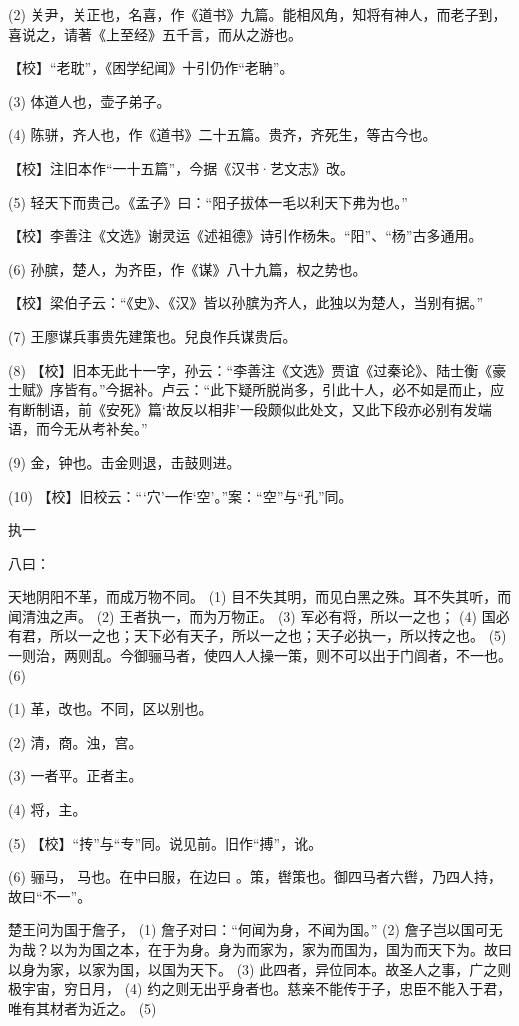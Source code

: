 \documentclass[12pt,UTF8]{ctexbook}
\begin{document}
(2) 关尹，关正也，名喜，作《道书》九篇。能相风角，知将有神人，而老子到，喜说之，请著《上至经》五千言，而从之游也。

【校】“老耽”，《困学纪闻》十引仍作“老聃”。

(3) 体道人也，壶子弟子。

(4) 陈骈，齐人也，作《道书》二十五篇。贵齐，齐死生，等古今也。

【校】注旧本作“一十五篇”，今据《汉书·艺文志》改。

(5) 轻天下而贵己。《孟子》曰：“阳子拔体一毛以利天下弗为也。”

【校】李善注《文选》谢灵运《述祖德》诗引作杨朱。“阳”、“杨”古多通用。

(6) 孙膑，楚人，为齐臣，作《谋》八十九篇，权之势也。

【校】梁伯子云：“《史》、《汉》皆以孙膑为齐人，此独以为楚人，当别有据。”

(7) 王廖谋兵事贵先建策也。兒良作兵谋贵后。

(8) 【校】旧本无此十一字，孙云：“李善注《文选》贾谊《过秦论》、陆士衡《豪士赋》序皆有。”今据补。卢云：“此下疑所脱尚多，引此十人，必不如是而止，应有断制语，前《安死》篇‘故反以相非’一段颇似此处文，又此下段亦必别有发端语，而今无从考补矣。”

(9) 金，钟也。击金则退，击鼓则进。

(10) 【校】旧校云：“‘穴’一作‘空’。”案：“空”与“孔”同。





执一


八曰：

天地阴阳不革，而成万物不同。 (1) 目不失其明，而见白黑之殊。耳不失其听，而闻清浊之声。 (2) 王者执一，而为万物正。 (3) 军必有将，所以一之也； (4) 国必有君，所以一之也；天下必有天子，所以一之也；天子必执一，所以抟之也。 (5) 一则治，两则乱。今御骊马者，使四人人操一策，则不可以出于门闾者，不一也。 (6)

(1) 革，改也。不同，区以别也。

(2) 清，商。浊，宫。

(3) 一者平。正者主。

(4) 将，主。

(5) 【校】“抟”与“专”同。说见前。旧作“搏”，讹。

(6) 骊马， 马也。在中曰服，在边曰 。策，辔策也。御四马者六辔，乃四人持，故曰“不一”。

楚王问为国于詹子， (1) 詹子对曰：“何闻为身，不闻为国。” (2) 詹子岂以国可无为哉？以为为国之本，在于为身。身为而家为，家为而国为，国为而天下为。故曰以身为家，以家为国，以国为天下。 (3) 此四者，异位同本。故圣人之事，广之则极宇宙，穷日月， (4) 约之则无出乎身者也。慈亲不能传于子，忠臣不能入于君，唯有其材者为近之。 (5)
\end{document}
